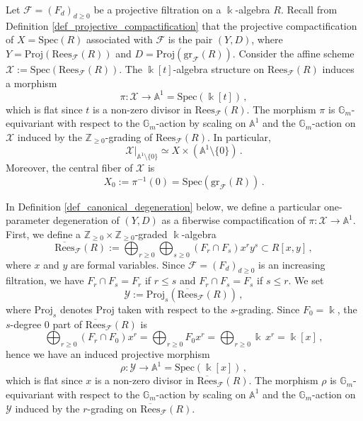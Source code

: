 \documentclass[12pt,letterpaper, reqno]{amsart}
\theoremstyle{defstyle} \newtheorem{definition}[theorem]{Definition}
\theoremstyle{remark}
\numberwithin{equation}{section}
\numberwithin{figure}{section}
\newcommand{\cF} {\mathcal{F}}
\newcommand{\Spec} {\mathrm{Spec}}
\newcommand{\Proj} {\mathrm{Proj}}
\newcommand{\gr} {\mathrm{gr}}
\newcommand{\kk} {\Bbbk}
\newcommand{\A} {\mathbb{A}}
\newcommand{\G} {\mathbb{G}}
\newcommand{\ZZ} {\mathbb{Z}}
\newcommand{\cY} {\mathcal{Y}}
\newcommand{\cX} {\mathcal{X}}
\begin{document}
Let $\cF=(F_d)_{d \geq 0}$ be a projective filtration on a $\kk$-algebra $R$. 
Recall from Definition \ref{def_projective_compactification} that the projective compactification of $X=\Spec(R)$ 
associated with $\cF$ is the pair $(Y,D)$, where $Y=\Proj \left( \mathrm{Rees}_\cF(R) \right)$ and $D=\Proj \left( \gr_\cF(R) \right)$.
Consider the affine scheme $\cX :=\Spec \left( \mathrm{Rees}_\cF(R) \right)$.  The $\kk[t]$-algebra structure on 
$\mathrm{Rees}_\cF(R)$ induces a morphism 
\begin{equation} \label{eq_pi}
\pi: \cX \longrightarrow \A^1=\Spec (\kk[t]) \,,\end{equation}
which is flat since $t$ is a non-zero divisor in $\mathrm{Rees}_\cF(R)$. 
The morphism $\pi$ is $\G_m$-equivariant with respect to the $\G_m$-action by scaling  on 
$\A^1$ and the $\G_m$-action on $\cX$ induced by the $\ZZ_{\geq 0}$-grading of $\mathrm{Rees}_\cF(R)$.
In particular, 
\[ \cX|_{\A^1 \setminus \{0\}} \simeq X \times (\A^1 \setminus \{0\})\,.\] 
Moreover, the central fiber of $\cX$ is 
\[ X_0 := \pi^{-1}(0) = \Spec \left( \gr_\cF(R)\right) \,.\]

In Definition \ref{def_canonical_degeneration} below, we define a particular one-parameter 
degeneration of $(Y,D)$ as a fiberwise compactification 
of $\pi: \cX \rightarrow \A^1$.
First, we define a $\ZZ_{\geq 0} \times \ZZ_{\geq 0}$-graded $\kk$-algebra
\begin{equation}
\label{eq_overline_rees}
     \overline{\mathrm{Rees}}_\cF(R) := \bigoplus_{r \geq 0} \bigoplus_{s \geq 0} (F_r \cap F_s) x^r y^s    \subset R[x,y] \,,
\end{equation}
where $x$ and $y$ are formal variables.
Since $\cF=(F_d)_{d\geq 0}$ is an increasing filtration, we have 
$F_r \cap F_s = F_r$ if $r \leq s$ and 
$F_r \cap F_s=F_s$ if $s \leq r$.
We set
\[ \cY := \Proj_s \left( \overline{\mathrm{Rees}}_\cF(R) \right)\,,\]
where $\Proj_s$ denotes $\Proj$ taken with respect to the $s$-grading.  
Since $F_0=\kk$, the $s$-degree $0$ part of $\overline{\mathrm{Rees}}_\cF(R)$ is 
\[ \bigoplus_{r \geq 0}(F_r \cap F_0) x^r= \bigoplus_{r \geq 0} F_0 x^r= \bigoplus_{r \geq 0} \kk\, x^r =\kk[x]\,,\] 
hence we have an induced projective morphism
\begin{equation} \label{eq_rho}
\rho: \cY \longrightarrow \A^1 = \Spec(\kk[x]) \,,\end{equation}
which is flat since $x$ is a non-zero divisor in $\overline{\mathrm{Rees}}_\cF(R)$.
The morphism $\rho$ is $\mathbb{G}_m$-equivariant with respect to the $\mathbb{G}_m$-action by scaling on $\A^1$ and the $\G_m$-action on $\cY$ induced by the $r$-grading on $\overline{\mathrm{Rees}}_\cF(R)$.
\end{document}

